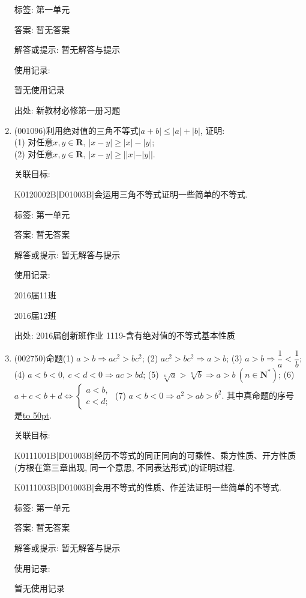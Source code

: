 \documentclass[10pt,a4paper]{article}
\newcommand{\blank}[1]{\underline{\hbox to #1pt{}}}
\begin{document}
\begin{enumerate}[1.]
标签: 第一单元

答案: 暂无答案

解答或提示: 暂无解答与提示

使用记录:

暂无使用记录


出处: 新教材必修第一册习题
\item { (001096)}利用绝对值的三角不等式$|a+b|\le |a|+|b|$, 证明:\\ 
(1) 对任意$x,y\in\mathbf{R}$, $|x-y|\ge |x|-|y|$;\\ 
(2) 对任意$x,y\in\mathbf{R}$, $|x-y|\ge ||x|-|y||$.


关联目标:

K0120002B|D01003B|会运用三角不等式证明一些简单的不等式.



标签: 第一单元

答案: 暂无答案

解答或提示: 暂无解答与提示

使用记录:

2016届11班		

2016届12班		


出处: 2016届创新班作业	1119-含有绝对值的不等式基本性质
\item { (002750)}命题(1) $a>b\Rightarrow ac^2>bc^2$;   (2) $ac^2>bc^2\Rightarrow a>b$;     (3) $a>b\Rightarrow \dfrac 1a<\dfrac 1b$; (4) $a<b<0, \ c<d<0\Rightarrow ac>bd$;   (5) $\sqrt[n]a>\sqrt[n]b\Rightarrow a>b \ (n\in \mathbf{N}^*)$;    (6) $a+c<b+d\Leftrightarrow \begin{cases} a<b, \\ c<d; \end{cases}$ (7) $a<b<0\Rightarrow a^2>ab>b^2$. 其中真命题的序号是\blank{50}.


关联目标:

K0111001B|D01003B|经历不等式的同正同向的可乘性、乘方性质、开方性质(方根在第三章出现, 同一个意思, 不同表达形式)的证明过程.

K0111003B|D01003B|会用不等式的性质、作差法证明一些简单的不等式.



标签: 第一单元

答案: 暂无答案

解答或提示: 暂无解答与提示

使用记录:

暂无使用记录



\end{enumerate}
\end{document}

